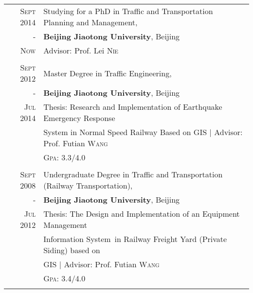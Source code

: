 \documentclass[a4paper,10pt]{article} %
\begin{document}
\begin{tabular}{rl}	

\textsc{Sept} 2014 & Studying for a PhD in Traffic and Transportation Planning and Management,\\
-  & \textbf{Beijing Jiaotong University}, Beijing\\
\textsc{Now} & \small Advisor: Prof. Lei \textsc{Nie}\\
&\\


\textsc{Sept} 2012 & Master Degree in Traffic Engineering,\\
-  & \textbf{Beijing Jiaotong University}, Beijing\\
\textsc{Jul} 2014 & Thesis: Research and Implementation of Earthquake Emergency Response\\
& System in Normal Speed Railway Based on GIS | \small Advisor: Prof. Futian \textsc{Wang}\\
&\normalsize \textsc{Gpa}: 3.3/4.0 \\
&\\


\textsc{Sept} 2008 & Undergraduate Degree in Traffic and Transportation (Railway Transportation), \\
- &  \normalsize\textbf{Beijing Jiaotong University}, Beijing\\
\textsc{Jul} 2012 
& Thesis: The Design and Implementation of an Equipment Management \\
& Information System in Railway Freight Yard (Private Siding) based on \\ 
& GIS | \small Advisor: Prof. Futian \textsc{Wang}\\
&\normalsize \textsc{Gpa}: 3.4/4.0 \\
&\\




\end{tabular}
\end{document}
